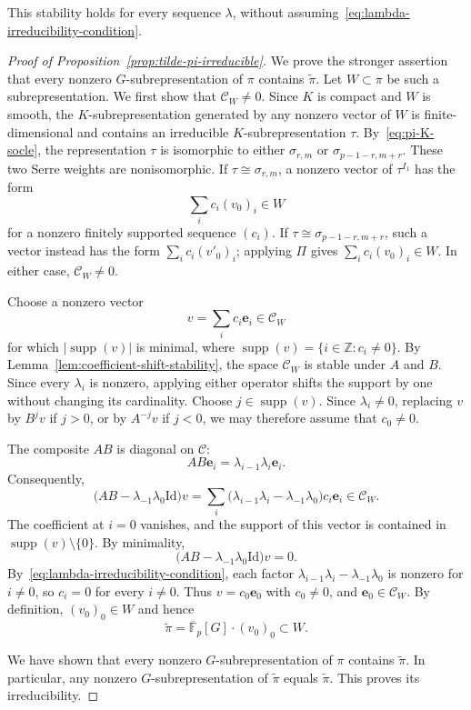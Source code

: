 \documentclass[10pt]{article}
\theoremstyle{plain}
\theoremstyle{definition}
\theoremstyle{remark}
\newcommand{\Fpbar}{\overline{\mathbb{F}}_p}
\newcommand{\Id}{\mathrm{Id}}
\begin{document}
This stability holds for every sequence $\lambda$, without assuming~\eqref{eq:lambda-irreducibility-condition}.

\begin{proof}[Proof of Proposition~\ref{prop:tilde-pi-irreducible}]
We prove the stronger assertion that every nonzero $G$-subrepresentation of $\pi$ contains $\widetilde\pi$. Let $W\subset\pi$ be such a subrepresentation. We first show that $\mathcal C_W\ne0$. Since $K$ is compact and $W$ is smooth, the $K$-subrepresentation generated by any nonzero vector of $W$ is finite-dimensional and contains an irreducible $K$-subrepresentation $\tau$. By~\eqref{eq:pi-K-socle}, the representation $\tau$ is isomorphic to either $\sigma_{r,m}$ or $\sigma_{p-1-r,m+r}$. These two Serre weights are nonisomorphic. If $\tau\cong\sigma_{r,m}$, a nonzero vector of $\tau^{I_1}$ has the form
\[
\sum_i c_i(v_0)_i\in W
\]
for a nonzero finitely supported sequence $(c_i)$. If $\tau\cong\sigma_{p-1-r,m+r}$, such a vector instead has the form $\sum_i c_i(v'_0)_i$; applying $\Pi$ gives $\sum_i c_i(v_0)_i\in W$. In either case, $\mathcal C_W\ne0$.

Choose a nonzero vector
\[
v=\sum_i c_i\mathbf e_i\in\mathcal C_W
\]
for which $|\operatorname{supp}(v)|$ is minimal, where $\operatorname{supp}(v)=\{i\in\mathbb{Z}:c_i\ne0\}$. By Lemma~\ref{lem:coefficient-shift-stability}, the space $\mathcal C_W$ is stable under $A$ and $B$. Since every $\lambda_i$ is nonzero, applying either operator shifts the support by one without changing its cardinality. Choose $j\in\operatorname{supp}(v)$. Since $\lambda_i \neq 0$, replacing $v$ by $B^jv$ if $j>0$, or by $A^{-j}v$ if $j<0$, we may therefore assume that $c_0\ne0$. 

The composite $AB$ is diagonal on $\mathcal C$:
\[
AB\mathbf e_i=\lambda_{i-1}\lambda_i\mathbf e_i.
\]
Consequently,
\begin{equation}\label{eq:minimal-support-AB}
\bigl(AB-\lambda_{-1}\lambda_0\Id\bigr)v
=\sum_i\bigl(\lambda_{i-1}\lambda_i-\lambda_{-1}\lambda_0\bigr)c_i\mathbf e_i
\in\mathcal C_W.
\end{equation}
The coefficient at $i=0$ vanishes, and the support of this vector is contained in $\operatorname{supp}(v)\setminus\{0\}$. By minimality,
\[
\bigl(AB-\lambda_{-1}\lambda_0\Id\bigr)v=0.
\]
By~\eqref{eq:lambda-irreducibility-condition}, each factor $\lambda_{i-1}\lambda_i-\lambda_{-1}\lambda_0$ is nonzero for $i\ne0$, so $c_i=0$ for every $i\ne0$. Thus $v=c_0\mathbf e_0$ with $c_0\ne0$, and $\mathbf e_0\in\mathcal C_W$. By definition, $(v_0)_0\in W$ and hence
\[
\widetilde\pi=\Fpbar[G]\cdot(v_0)_0\subset W.
\]

We have shown that every nonzero $G$-subrepresentation of $\pi$ contains $\widetilde\pi$. In particular, any nonzero $G$-subrepresentation of $\widetilde\pi$ equals $\widetilde\pi$. This proves its irreducibility.
\end{proof}
\end{document}
